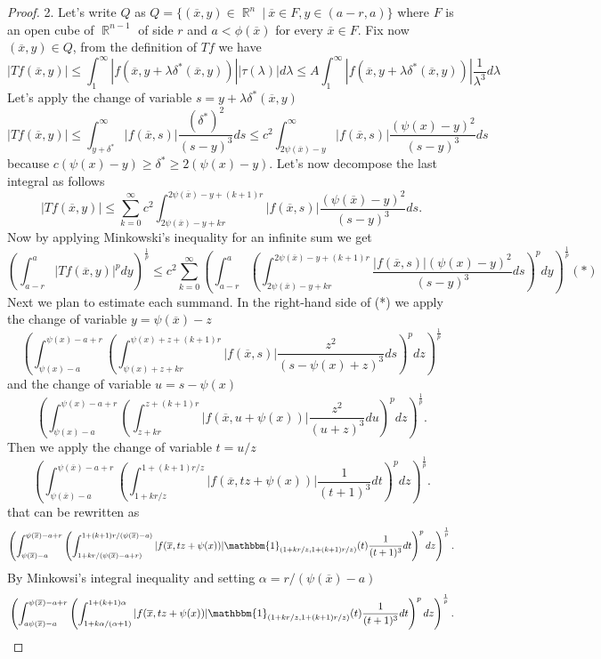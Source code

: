 \documentclass[12pt]{article}
\theoremstyle{definition}
\DeclareMathOperator\rr{\mathbb{R}}
\begin{document}
\begin{proof}
2. Let's write $Q$ as $Q=\{ (\overline x,y) \in \rr^n \ | \ \overline x \in F, y \in (a-r,a) \}$ where $F$ is an open cube of $\rr^{n-1}$ of side $r$ and $a<\phi(\overline x)$ for every $\overline x \in F$. Fix now $(\overline x, y) \in Q$, from the definition of $Tf$ we have
\[ |Tf(\overline x,y)|\le\int_1^\infty |f(\overline x, y+\lambda \delta^*(\overline x,y))||\tau(\lambda)|d\lambda \le A \int_1^\infty |f(\overline x, y+\lambda \delta^*(\overline x,y))|\frac{1}{\lambda^3}d\lambda\]
Let's apply the change of variable $s=y+\lambda \delta^*(\overline x,y)$
\[ |Tf(\overline x,y)|\le\int_{y+\delta^*}^\infty |f(\overline x, s)|\frac{(\delta^*)^2}{(s-y)^3}ds\le c^2 \int_{2\psi(\overline x)-y}^\infty |f(\overline x, s)|\frac{(\psi(x)-y)^2}{(s-y)^3}ds\]
because $c(\psi(x)-y)\ge\delta^*\ge 2(\psi(x)-y).$ Let's now decompose the last integral as follows
\[ |Tf(\overline x,y)|\le \sum_{k=0}^\infty c^2\int_{2\psi(\overline x)-y+kr}^{2\psi(\overline x)-y+(k+1)r} |f(\overline x, s)|\frac{(\psi(\overline x)-y)^2}{(s-y)^3}ds.\]
Now by applying Minkowski's inequality for an infinite sum we get
\[ \left(\int_{a-r}^{a}|Tf(\overline x,y)|^p dy\right)^{\frac{1}{p}}\le  c^2\sum_{k=0}^\infty \left( \int_{a-r}^{a}\left ( \int_{2\psi(\overline x)-y+kr}^{2\psi(\overline x)-y+(k+1)r} \frac{|f(\overline x, s)|(\psi(x)-y)^2}{(s-y)^3}ds\right)^pdy \right)^{\frac{1}{p}} (*)\]
Next we plan to estimate each summand. In the right-hand side of (*) we apply the change of variable $y=\psi(\overline x)-z$ 
\[ \left( \int_{\psi(x)-a}^{\psi(x)-a+r}\left (\int_{\psi(x)+z+kr}^{\psi(x)+z+(k+1)r} |f(\overline x, s)|\frac{z^2}{(s-\psi(x)+z)^3}ds\right)^pdz \right)^{\frac{1}{p}}\]
and the change of variable $u=s-\psi(x)$
\[ \left( \int_{\psi(x)-a}^{\psi(x)-a+r}\left (\int_{z+kr}^{z+(k+1)r} |f(\overline x, u+\psi(x))|\frac{z^2}{(u+z)^3}du\right)^pdz \right)^{\frac{1}{p}}.\]
Then we apply the change of variable $t=u/z$
\[ \left( \int_{\psi(\overline x) - a}^{\psi(\overline x) -a+r}\left (\int_{1+kr/z}^{1+(k+1)r/z} |f(\overline x, tz+\psi(x))|\frac{1}{(t+1)^3}dt\right)^pdz \right)^{\frac{1}{p}}.\]
that can be rewritten as
 \[  \left( \int_{\psi(\overline x) -a}^{\psi(\overline x) -a+r}\left (\int_{1+kr/(\psi(\overline x) -a+r)}^{1+(k+1)r/(\psi(\overline x)-a)} |f(\overline x, tz+\psi(x))|\mathbbm{1}_{(1+kr/z,  1+(k+1)r/z ) }(t)\frac{1}{(t+1)^3}dt\right)^pdz \right)^{\frac{1}{p}}.\]
 By Minkowsi's integral inequality and setting $\alpha=r/(\psi(\overline x)-a)$
 \begin{align*}
  & \left( \int_{a\psi(\overline x) -a}^{\psi(\overline x) -a+r}\left (\int_{1+k\alpha/(\alpha+1)}^{1+(k+1)\alpha} |f(\overline x, tz+\psi(x))|\mathbbm{1}_{(1+kr/z,  1+(k+1)r/z ) }(t)\frac{1}{(t+1)^3}dt\right)^pdz \right)^{\frac{1}{p}}. \\

\end{align*}
\end{proof}
\end{document}
